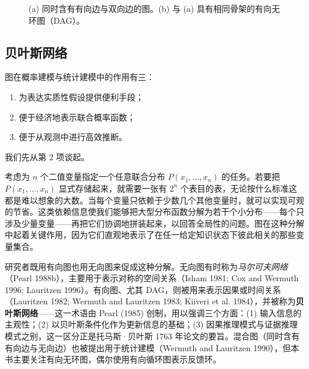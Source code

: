 \begin{figure}[htbp]
\centering
{}
\caption{(a) 同时含有有向边与双向边的图。(b) 与 (a) 具有相同骨架的有向无环图（DAG）。}
\label{fig:1.1}
\end{figure}

\subsection{贝叶斯网络}

图在概率建模与统计建模中的作用有三：
\begin{enumerate}[label=\arabic*.]
\item 为表达实质性假设提供便利手段；
\item 便于经济地表示联合概率函数；
\item 便于从观测中进行高效推断。
\end{enumerate}
我们先从第 2 项谈起。

考虑为 $n$ 个二值变量指定一个任意联合分布 $P(x_1,\dots,x_n)$ 的任务。若要把 $P(x_1,\dots,x_n)$ 显式存储起来，就需要一张有 $2^n$ 个表目的表，无论按什么标准这都是难以想象的大数。当每个变量只依赖于少数几个其他变量时，就可以实现可观的节省。这类依赖信息使我们能够把大型分布函数分解为若干个小分布——每个只涉及少量变量——再把它们协调地拼装起来，以回答全局性的问题。图在这种分解中起着关键作用，因为它们直观地表示了在任一给定知识状态下彼此相关的那些变量集合。

研究者既用有向图也用无向图来促成这种分解。无向图有时称为\emph{马尔可夫网络}（Pearl 1988b），主要用于表示对称的空间关系（Isham 1981; Cox and Wermuth 1996; Lauritzen 1996）。有向图、尤其 DAG，则被用来表示因果或时间关系（Lauritzen 1982; Wermuth and Lauritzen 1983; Kiiveri et al. 1984），并被称为\textbf{贝叶斯网络}——这一术语由 Pearl (1985) 创制，用以强调三个方面：(1) 输入信息的主观性；(2) 以贝叶斯条件化作为更新信息的基础；(3) 因果推理模式与证据推理模式之别，这一区分正是托马斯·贝叶斯 1763 年论文的要旨。混合图（同时含有有向边与无向边）也被提出用于统计建模（Wermuth and Lauritzen 1990），但本书主要关注有向无环图，偶尔使用有向循环图表示反馈环。

